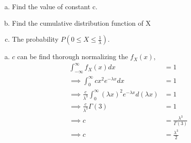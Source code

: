 \documentclass[answers]{exam}
\begin{document}
\begin{questions}
{        \begin{enumerate}[(a)]
            \item Find the value of constant c.
            \item Find the cumulative distribution function of X
            \item The probability $P(0 \leq X \leq \frac{1}{\lambda})$.
        \end{enumerate}

    }

    \begin{framed}
        \begin{enumerate}[(a)]
            \item $c$ can be find thorough normalizing the $f_{X}(x)$,
                  \begin{equation*}
                      \begin{split}
                          \int_{-\infty}^{\infty}f_{X}(x)dx & = 1\\
                          \implies\int_{0}^{\infty}cx^2 e^{-\lambda x}dx & = 1\\
                          \implies \frac{c}{\lambda^3}\int_{0}^{\infty}(\lambda x)^2 e^{-\lambda x}d(\lambda x) & = 1\\
                          \implies \frac{c}{\lambda^3}\Gamma(3) & = 1\\
                          \implies c & = \frac{\lambda^3}{\Gamma(3)}\\
                          \implies c & = \frac{\lambda^3}{2}\\
                      \end{split}
                  \end{equation*}


\end{enumerate}
\end{framed}
\end{questions}
\end{document}
